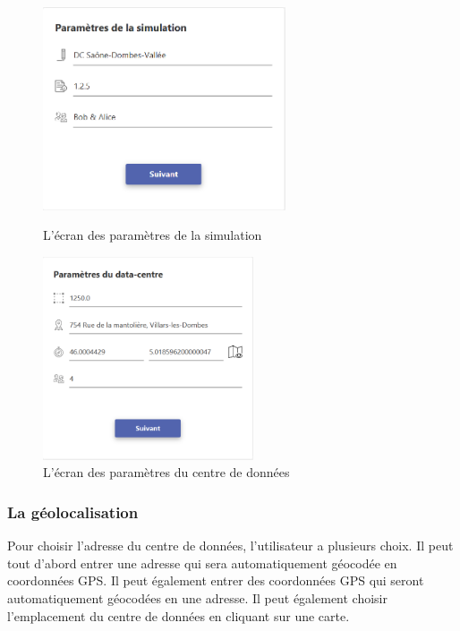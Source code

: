 \begin{figure}[h!]
	\begin{minipage}{0.48\textwidth}
		\centering
		\includegraphics[height=6cm]{partie3/images/simulation.png}
		\caption{L'écran des paramètres de la simulation}
	\end{minipage}\hfill
	\begin{minipage}{0.48\textwidth}
		\centering
		\includegraphics[height=6cm]{partie3/images/datacenter.png}
		\caption{L'écran des paramètres du centre de données}
	\end{minipage}\hfill
\end{figure}

\subsubsection{La géolocalisation}
Pour choisir l'adresse du centre de données, l'utilisateur a plusieurs choix. Il peut tout d'abord entrer une adresse qui sera automatiquement géocodée en coordonnées GPS. Il peut également entrer des coordonnées GPS qui seront automatiquement géocodées en une adresse. Il peut également choisir l'emplacement du centre de données en cliquant sur une carte.

